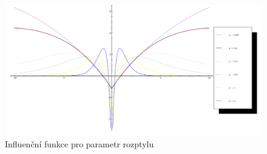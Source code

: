 \begin{figure}[htb]
  \centering
    \includegraphics[scale=0.30]{IF-Laplace-sigma.png}
          \caption{Influenční funkce pro parametr rozptylu}
    \label{fig:IF-Laplace-sigma}
\end{figure}


%
%
%



